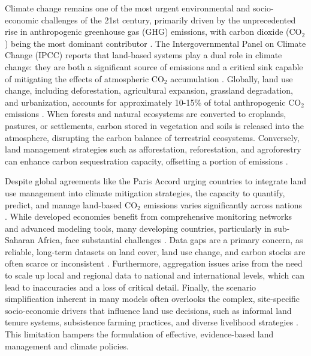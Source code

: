 \documentclass[10pt,letterpaper]{article}
\begin{document}
Climate change remains one of the most urgent environmental and socio-economic challenges of the 21st century, primarily driven by the unprecedented rise in anthropogenic greenhouse gas (GHG) emissions, with carbon dioxide (CO$_2$) being the most dominant contributor \cite{kabir2023impacts, filonchyk2024greenhouse,ghg_emitters_2024}. The Intergovernmental Panel on Climate Change (IPCC) reports that land-based systems play a dual role in climate change: they are both a significant source of emissions and a critical sink capable of mitigating the effects of atmospheric CO$_2$ accumulation \cite{yamanoshita2022ipcc}. Globally, land use change, including deforestation, agricultural expansion, grassland degradation, and urbanization, accounts for approximately 10-15\% of total anthropogenic CO$_2$ emissions \cite{li2024global, liu2023progress,agriculture_emissions_2024}. When forests and natural ecosystems are converted to croplands, pastures, or settlements, carbon stored in vegetation and soils is released into the atmosphere, disrupting the carbon balance of terrestrial ecosystems. Conversely, land management strategies such as afforestation, reforestation, and agroforestry can enhance carbon sequestration capacity, offsetting a portion of emissions \cite{verma2023land, menard2023carbon}.

Despite global agreements like the Paris Accord urging countries to integrate land use management into climate mitigation strategies, the capacity to quantify, predict, and manage land-based CO$_2$ emissions varies significantly across nations \cite{chlela2024integrated}. While developed economies benefit from comprehensive monitoring networks and advanced modeling tools, many developing countries, particularly in sub-Saharan Africa, face substantial challenges \cite{kuteyi2022logistics}. Data gaps are a primary concern, as reliable, long-term datasets on land cover, land use change, and carbon stocks are often scarce or inconsistent \cite{nedd2021synthesis}. Furthermore, aggregation issues arise from the need to scale up local and regional data to national and international levels, which can lead to inaccuracies and a loss of critical detail. Finally, the scenario simplification inherent in many models often overlooks the complex, site-specific socio-economic drivers that influence land use decisions, such as informal land tenure systems, subsistence farming practices, and diverse livelihood strategies \cite{mutale2024modeling,kariuki2022serengeti}. This limitation hampers the formulation of effective, evidence-based land management and climate policies.
\end{document}
